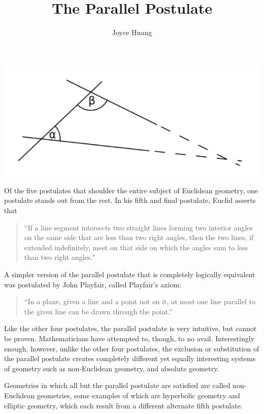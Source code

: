 \documentclass{article}
\title{The Parallel Postulate}
\author{Joyce Huang}
\begin{document}
\maketitle
\begin{center}
    \includegraphics[scale = 0.5]{images/parallel1.png}
\end{center}
Of the five postulates that shoulder the entire subject of Euclidean geometry, one postulate stands out from the rest. In his fifth and final postulate, Euclid asserts that 

\begin{quote}
``If a line segment intersects two straight lines forming two interior angles on the same side that are less than two right angles, then the two lines, if extended indefinitely, meet on that side on which the angles sum to less than two right angles."
\end{quote}

A simpler version of the parallel postulate that is completely logically equivalent was postulated by John Playfair, called Playfair’s axiom:

\begin{quote}
“In a plane, given a line and a point not on it, at most one line parallel to the given line can be drawn through the point.”
\end{quote}

Like the other four postulates, the parallel postulate is very intuitive, but cannot be proven. Mathematicians have attempted to, though, to no avail. Interestingly enough, however, unlike the other four postulates, the exclusion or substitution of the parallel postulate creates completely different yet equally interesting systems of geometry such as non-Euclidean geometry, and absolute geometry. 

Geometries in which all but the parallel postulate are satisfied are called non-Euclidean geometries, some examples of which are hyperbolic geometry and elliptic geometry, which each result from a different alternate fifth postulate. 
\end{document}
